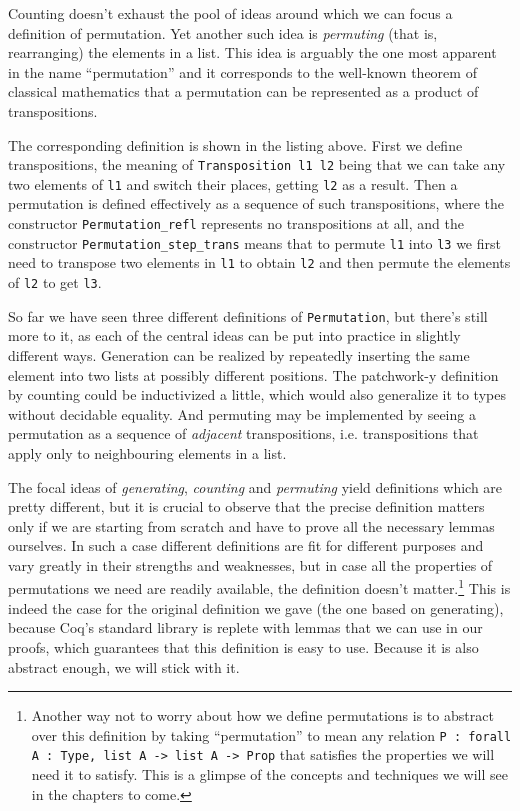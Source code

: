 \documentclass[declaration,mgr,english,shortabstract]{iithesis}
\newcommand{\m}[1]{\texttt{#1}}
\begin{document}
Counting doesn't exhaust the pool of ideas around which we can focus a definition of permutation. Yet another such idea is \textit{permuting} (that is, rearranging) the elements in a list. This idea is arguably the one most apparent in the name ``permutation'' and it corresponds to the well-known theorem of classical mathematics that a permutation can be represented as a product of transpositions.

The corresponding definition is shown in the listing above. First we define transpositions, the meaning of \m{Transposition l1 l2} being that we can take any two elements of \m{l1} and switch their places, getting \m{l2} as a result. Then a permutation is defined effectively as a sequence of such transpositions, where the constructor \m{Permutation\_refl} represents no transpositions at all, and the constructor \m{Permutation\_step\_trans} means that to permute \m{l1} into \m{l3} we first need to transpose two elements in \m{l1} to obtain \m{l2} and then permute the elements of \m{l2} to get \m{l3}.

So far we have seen three different definitions of \m{Permutation}, but there's still more to it, as each of the central ideas can be put into practice in slightly different ways. Generation can be realized by repeatedly inserting the same element into two lists at possibly different positions. The patchwork-y definition by counting could be inductivized a little, which would also generalize it to types without decidable equality. And permuting may be implemented by seeing a permutation as a sequence of \textit{adjacent} transpositions, i.e. transpositions that apply only to neighbouring elements in a list.

The focal ideas of \textit{generating}, \textit{counting} and \textit{permuting} yield definitions which are pretty different, but it is crucial to observe that the precise definition matters only if we are starting from scratch and have to prove all the necessary lemmas ourselves. In such a case different definitions are fit for different purposes and vary greatly in their strengths and weaknesses, but in case all the properties of permutations we need are readily available, the definition doesn't matter.\footnote{Another way not to worry about how we define permutations is to abstract over this definition by taking ``permutation'' to mean any relation \m{P : forall A : Type, list A -> list A -> Prop} that satisfies the properties we will need it to satisfy. This is a glimpse of the concepts and techniques we will see in the chapters to come.} This is indeed the case for the original definition we gave (the one based on generating), because Coq's standard library is replete with lemmas that we can use in our proofs, which guarantees that this definition is easy to use. Because it is also abstract enough, we will stick with it.
\end{document}
